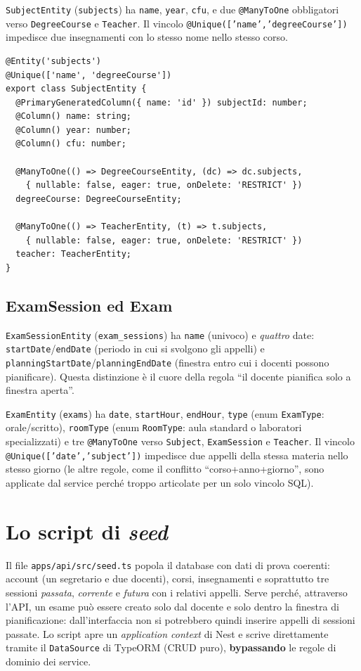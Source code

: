 \documentclass[11pt,a4paper,oneside]{report}
\newcommand{\code}[1]{\texttt{\small #1}}
\newcommand{\file}[1]{\texttt{\small #1}}
\begin{document}
\code{SubjectEntity} (\code{subjects}) ha \code{name}, \code{year}, \code{cfu}, e
due \code{@ManyToOne} obbligatori verso \code{DegreeCourse} e \code{Teacher}. Il
vincolo \code{@Unique(['name','degreeCourse'])} impedisce due insegnamenti con
lo stesso nome nello stesso corso.

\begin{lstlisting}[caption={Vincolo e relazioni di \file{subject.entity.ts} (estratto).}]
@Entity('subjects')
@Unique(['name', 'degreeCourse'])
export class SubjectEntity {
  @PrimaryGeneratedColumn({ name: 'id' }) subjectId: number;
  @Column() name: string;
  @Column() year: number;
  @Column() cfu: number;

  @ManyToOne(() => DegreeCourseEntity, (dc) => dc.subjects,
    { nullable: false, eager: true, onDelete: 'RESTRICT' })
  degreeCourse: DegreeCourseEntity;

  @ManyToOne(() => TeacherEntity, (t) => t.subjects,
    { nullable: false, eager: true, onDelete: 'RESTRICT' })
  teacher: TeacherEntity;
}
\end{lstlisting}

\subsection{ExamSession ed Exam}
\code{ExamSessionEntity} (\code{exam\_sessions}) ha \code{name} (univoco) e
\emph{quattro} date: \code{startDate}/\code{endDate} (periodo in cui si svolgono
gli appelli) e \code{planningStartDate}/\code{planningEndDate} (finestra entro
cui i docenti possono pianificare). Questa distinzione è il cuore della regola
``il docente pianifica solo a finestra aperta''.

\code{ExamEntity} (\code{exams}) ha \code{date}, \code{startHour},
\code{endHour}, \code{type} (enum \code{ExamType}: orale/scritto),
\code{roomType} (enum \code{RoomType}: aula standard o laboratori specializzati)
e tre \code{@ManyToOne} verso \code{Subject}, \code{ExamSession} e
\code{Teacher}. Il vincolo \code{@Unique(['date','subject'])} impedisce due
appelli della stessa materia nello stesso giorno (le altre regole, come il
conflitto ``corso+anno+giorno'', sono applicate dal service perché troppo
articolate per un solo vincolo SQL).

\section{Lo script di \emph{seed}}
Il file \file{apps/api/src/seed.ts} popola il database con dati di prova
coerenti: account (un segretario e due docenti), corsi, insegnamenti e
soprattutto tre sessioni \emph{passata}, \emph{corrente} e \emph{futura} con i
relativi appelli. Serve perché, attraverso l'API, un esame può essere creato
solo dal docente e solo dentro la finestra di pianificazione: dall'interfaccia
non si potrebbero quindi inserire appelli di sessioni passate. Lo script apre un
\emph{application context} di Nest e scrive direttamente tramite il
\code{DataSource} di TypeORM (CRUD puro), \textbf{bypassando} le regole di
dominio dei service.
\end{document}
